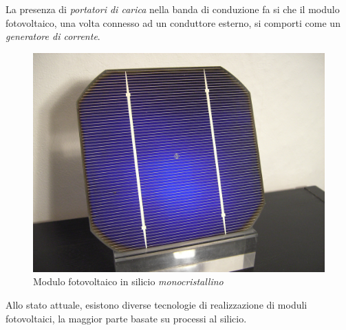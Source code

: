 %
La presenza di \emph{portatori di carica} nella banda di conduzione 
fa si che il modulo fotovoltaico, una volta connesso ad un 
conduttore esterno, si comporti come un 
\emph{generatore di corrente}\cite{bellini09}.
%
\begin{figure}[!h]
\centering
\includegraphics[width=350pt]{img/modulo-fotovoltaico.jpg}
\caption{Modulo fotovoltaico in silicio \emph{monocristallino}}
\end{figure}
%
Allo stato attuale, esistono diverse tecnologie di realizzazione di 
moduli fotovoltaici, la maggior parte basate su processi al silicio.









